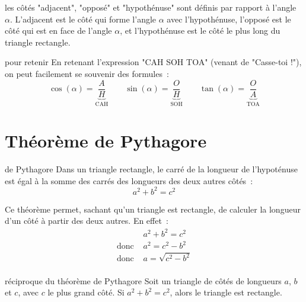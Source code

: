 \documentclass[12pt]{article}
\begin{document}
\begin{remarque}{}{}
    les côtés "adjacent", "opposé" et "hypothénuse" sont définis par rapport à l'angle $\alpha$. L'adjacent est le côté qui forme l'angle $\alpha$ avec l'hypothénuse, l'opposé est le côté qui est en face de l'angle $\alpha$, et l'hypothénuse est le côté le plus long du triangle rectangle.
\end{remarque}

\begin{remarque}{}{pour retenir}
    En retenant l'expression "CAH SOH TOA" (venant de "Casse-toi !"), on peut facilement se souvenir des formules~:
    $$\cos(\alpha) = \underbrace{\frac{A}{H}}_\text{CAH} \qquad \sin(\alpha) = \underbrace{\frac{O}{H}}_\text{SOH} \qquad \tan(\alpha) = \underbrace{\frac{O}{A}}_\text{TOA}$$
\end{remarque}

\section{Théorème de Pythagore}
\begin{theoreme}{}{de Pythagore}
Dans un triangle rectangle, le carré de la longueur de l'hypoténuse est égal à la somme des carrés des longueurs des deux autres côtés~:
$$a^2 + b^2 = c^2$$
\begin{center}
\end{center}
\end{theoreme}

\begin{remarque}{}{}
    Ce théorème permet, sachant qu'un triangle est rectangle, de calculer la longueur d'un côté à partir des deux autres. En effet~:
    \begin{align*}
    &a^2 + b^2 = c^2 \\
    \text{donc }& a^2 = c^2 - b^2 \\
    \text{donc }& a = \sqrt{c^2 - b^2} \\
    \end{align*}
\end{remarque}

\begin{theoreme}{}{réciproque du théorème de Pythagore}
    Soit un triangle de côtés de longueurs $a$, $b$ et $c$, avec $c$ le plus grand côté. Si $a^2 + b^2 = c^2$, alors le triangle est rectangle.
    \begin{center}
    \end{center}
\end{theoreme}
\end{document}
